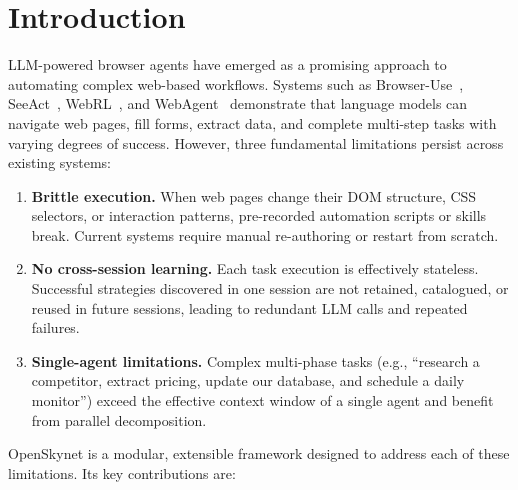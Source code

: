 \section{Introduction}

LLM-powered browser agents have emerged as a promising approach to automating complex web-based workflows. Systems such as Browser-Use~\cite{browseruse}, SeeAct~\cite{seeact}, WebRL~\cite{webrl}, and WebAgent~\cite{webagent} demonstrate that language models can navigate web pages, fill forms, extract data, and complete multi-step tasks with varying degrees of success. However, three fundamental limitations persist across existing systems:

\begin{enumerate}[leftmargin=*,itemsep=2pt]
    \item \textbf{Brittle execution.} When web pages change their DOM structure, CSS selectors, or interaction patterns, pre-recorded automation scripts or skills break. Current systems require manual re-authoring or restart from scratch.
    \item \textbf{No cross-session learning.} Each task execution is effectively stateless. Successful strategies discovered in one session are not retained, catalogued, or reused in future sessions, leading to redundant LLM calls and repeated failures.
    \item \textbf{Single-agent limitations.} Complex multi-phase tasks (e.g., ``research a competitor, extract pricing, update our database, and schedule a daily monitor'') exceed the effective context window of a single agent and benefit from parallel decomposition.
\end{enumerate}

OpenSkynet is a modular, extensible framework designed to address each of these limitations. Its key contributions are:

